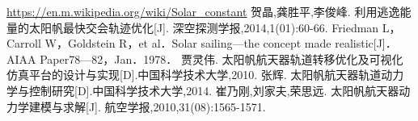 \documentclass[../Paper.tex]{subfiles}
\begin{document}
\begin{thebibliography}{99}

 \url{https://en.m.wikipedia.org/wiki/Solar_constant}
 贺晶,龚胜平,李俊峰. 利用逃逸能量的太阳帆最快交会轨迹优化[J]. 深空探测学报,2014,1(01):60-66. 
 Friedman L，Carroll W，Goldstein R，et al．Solar sailing—the concept made realistic[J]．AIAA Paper78—82，Jan．1978．
贾灵伟. 太阳帆航天器轨道转移优化及可视化仿真平台的设计与实现[D].中国科学技术大学,2010.
张辉. 太阳帆航天器轨道动力学与控制研究[D].中国科学技术大学,2014.
崔乃刚,刘家夫,荣思远. 太阳帆航天器动力学建模与求解[J]. 航空学报,2010,31(08):1565-1571. 
	
\end{thebibliography}
\end{document}
